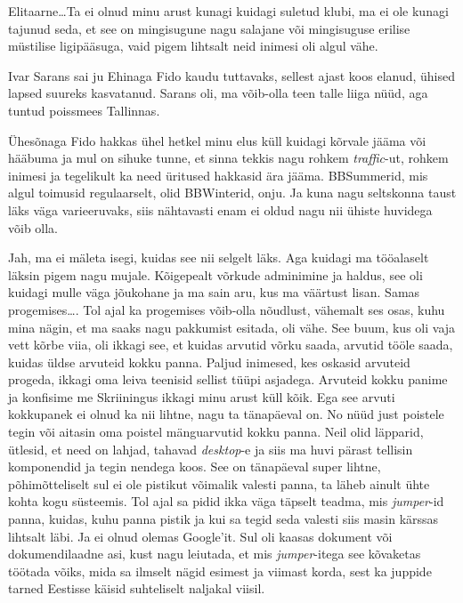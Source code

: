 
Elitaarne\ldots Ta ei olnud minu arust kunagi kuidagi suletud klubi,  ma ei ole kunagi tajunud seda, et see on mingisugune nagu salajane või mingisuguse erilise müstilise ligipääsuga, vaid pigem lihtsalt neid inimesi oli algul vähe. 

Ivar Sarans sai ju Ehinaga Fido kaudu tuttavaks, sellest ajast koos elanud, ühised lapsed suureks kasvatanud. Sarans oli, ma võib-olla teen talle liiga nüüd, aga tuntud poissmees Tallinnas. 

Ühesõnaga Fido hakkas ühel hetkel minu elus küll kuidagi kõrvale jääma või hääbuma ja mul on sihuke tunne, et sinna tekkis nagu rohkem \emph{traffic}-ut, rohkem inimesi ja tegelikult ka need üritused hakkasid ära jääma. BBSummerid, mis algul toimusid regulaarselt, olid BBWinterid, onju. Ja kuna nagu seltskonna taust  läks väga varieeruvaks, siis nähtavasti enam ei oldud nagu nii ühiste huvidega võib olla. 


Jah, ma ei mäleta isegi, kuidas see nii selgelt läks. Aga kuidagi ma tööalaselt läksin pigem nagu mujale. Kõigepealt võrkude adminimine ja haldus, see oli kuidagi mulle väga jõukohane ja ma sain aru, kus ma väärtust lisan. Samas progemises\ldots. Tol ajal ka progemises võib-olla nõudlust, vähemalt ses osas, kuhu mina nägin, et ma saaks nagu pakkumist esitada, oli vähe. See  buum, kus oli vaja vett kõrbe viia, oli ikkagi see, et kuidas arvutid võrku saada, arvutid tööle saada, kuidas üldse arvuteid kokku panna. Paljud inimesed, kes oskasid arvuteid progeda, ikkagi oma leiva teenisid sellist tüüpi asjadega. Arvuteid kokku panime ja konfisime me Skriiningus ikkagi minu arust küll kõik. Ega see arvuti kokkupanek ei olnud ka nii lihtne, nagu ta tänapäeval on. No nüüd just poistele tegin või aitasin oma poistel mänguarvutid  kokku panna. Neil olid läpparid, ütlesid, et need on lahjad, tahavad \emph{desktop}-e ja siis ma huvi pärast tellisin komponendid ja tegin nendega koos. See on tänapäeval super lihtne, põhimõtteliselt sul ei ole pistikut võimalik valesti panna, ta läheb ainult ühte kohta kogu süsteemis. Tol ajal sa pidid ikka väga täpselt teadma, mis \emph{jumper}-id panna, kuidas, kuhu panna pistik ja kui sa tegid seda valesti siis masin kärssas lihtsalt läbi. Ja ei olnud olemas Google'it. Sul oli kaasas dokument või dokumendilaadne asi, kust nagu leiutada, et mis \emph{jumper}-itega see kõvaketas töötada võiks, mida sa ilmselt nägid esimest ja viimast korda, sest  ka  juppide tarned Eestisse käisid suhteliselt naljakal viisil. 

